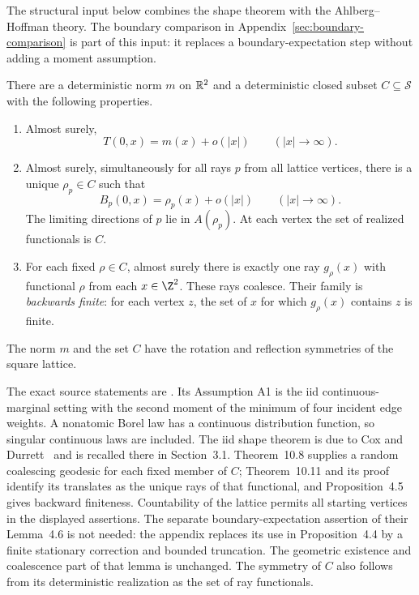 The structural input below combines the shape theorem with the
Ahlberg--Hoffman theory. The boundary comparison in
Appendix~\ref{sec:boundary-comparison} is part of this input: it replaces
a boundary-expectation step without adding a moment assumption.

\begin{theorem}
\label{thm:structure}
There are a deterministic norm \(m\) on \(\mathbb R^2\) and a deterministic
closed subset \(C\subseteq\mathcal S\) with the following properties.
\begin{enumerate}[label=\textup{(\roman*)}]
\item Almost surely,
\[
 T(0,x)=m(x)+o(|x|)\qquad (|x|\to\infty).
\]
\item Almost surely, simultaneously for all rays \(p\) from all lattice
vertices, there is a unique \(\rho_p\in C\) such that
\begin{equation}\label{eq:busemann-linearity}
 B_p(0,x)=\rho_p(x)+o(|x|)\qquad (|x|\to\infty).
\end{equation}
The limiting directions of \(p\) lie in \(A(\rho_p)\).
At each vertex the set of realized functionals is \(C\).
\item For each fixed \(\rho\in C\), almost surely there is exactly one
ray \(g_\rho(x)\) with functional \(\rho\) from each \(x\in\Z^2\).
These rays coalesce. Their family is \emph{backwards finite}: for each
vertex \(z\), the set of \(x\) for which \(g_\rho(x)\) contains \(z\)
is finite.
\end{enumerate}
The norm \(m\) and the set \(C\) have the rotation and reflection
symmetries of the square lattice.
\end{theorem}

The exact source statements are
\cite[Assumption A1, Theorems 2.5--2.6 and 10.8--10.11,
and Proposition 4.5]{AhlbergHoffman}.
Its Assumption A1 is the iid continuous-marginal setting with the
second moment of the minimum of four incident edge weights.
A nonatomic Borel law has a continuous distribution function, so
singular continuous laws are included.
The iid shape theorem is due to Cox and Durrett~\cite{CoxDurrett1981}
and is recalled there in Section~3.1.
Theorem~10.8 supplies a random coalescing geodesic for each fixed
member of \(C\); Theorem~10.11 and its proof identify its translates
as the unique rays of that functional, and Proposition~4.5 gives
backward finiteness. Countability of the lattice permits all starting
vertices in the displayed assertions.
The separate boundary-expectation assertion of their Lemma~4.6 is not
needed: the appendix replaces its use in Proposition~4.4 by a finite
stationary correction and bounded truncation. The geometric
existence and coalescence part of that lemma is unchanged.
The symmetry of \(C\) also follows from its deterministic realization
as the set of ray functionals.

